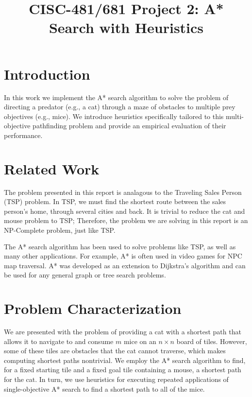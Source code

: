 \documentclass[12pt, conference, compsocconf]{IEEEtran}
\begin{document}
\title{CISC-481/681 Project 2: A* Search with Heuristics}

\author{
}

\maketitle

\section{Introduction}
In this work we implement the A* search algorithm to solve the problem of
directing a predator (e.g., a cat) through a maze of obstacles to multiple prey
objectives (e.g., mice).  We introduce heuristics specifically tailored to this
multi-objective pathfinding problem and provide an empirical evaluation of
their performance.

\section{Related Work}
The problem presented in this report is analagous to the Traveling Sales Person
(TSP) problem.  In TSP, we must find the shortest route between the
sales person's home, through several cities and back.  It is trivial to reduce
the cat and mouse problem to TSP; Therefore, the problem we are solving in this
report is an NP-Complete problem, just like TSP.

The A* search algorithm has been used to solve problems like TSP, as well as
many other applications.  For example, A* is often used in video games for NPC
map traversal.  A* was developed as an extension to Dijkstra's algorithm and
can be used for any general graph or tree search problems.

\section{Problem Characterization}
We are presented with the problem of providing a cat with a shortest path that
allows it to navigate to and consume $m$ mice on an $n \times n$ board of
tiles.  However, some of these tiles are obstacles that the cat cannot
traverse, which makes computing shortest paths nontrivial.  We employ the A*
search algorithm to find, for a fixed starting tile and a fixed goal tile
containing a mouse, a shortest path for the cat.  In turn, we use heuristics
for executing repeated applications of single-objective A* search to find a
shortest path to all of the mice.
\end{document}
